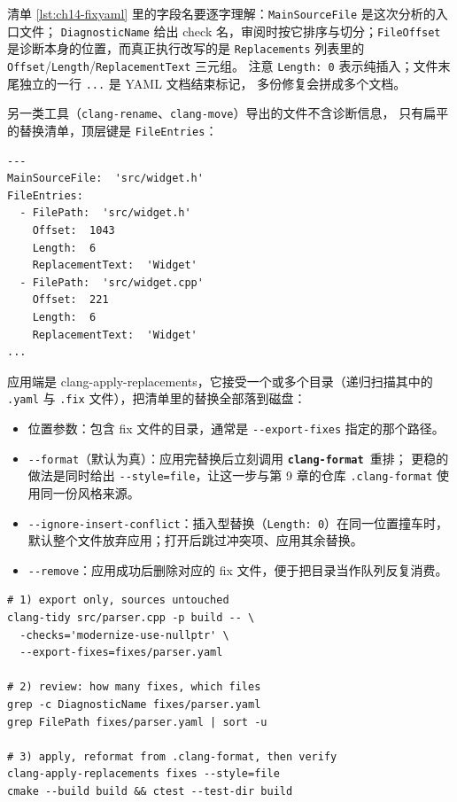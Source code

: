 \documentclass[12pt,a4paper,fontset=fandol]{ctexbook}
\newcommand{\Opt}[1]{\texttt{-\/-#1}}
\newcommand{\Bk}{\discretionary{}{}{}}
\newcommand{\Lib}[1]{\textbf{\texttt{#1}}}
\newcommand{\Fmt}{\Lib{clang-format}}
\begin{document}
清单 \ref{lst:ch14-fixyaml} 里的字段名要逐字理解：\texttt{Main{\Bk}Source{\Bk}File} 是这次分析的入口文件；
\texttt{Diagnostic{\Bk}Name} 给出 check 名，审阅时按它排序与切分；\texttt{FileOffset}
是诊断本身的位置，而真正执行改写的是 \texttt{Replacements} 列表里的
\texttt{Offset}/{\Bk}\texttt{Length}/{\Bk}\texttt{Replacement{\Bk}Text} 三元组。
注意 \texttt{Length: 0} 表示纯插入；文件末尾独立的一行 \texttt{...} 是 YAML 文档结束标记，
多份修复会拼成多个文档。

另一类工具（\texttt{clang-rename}、\texttt{clang-move}）导出的文件不含诊断信息，
只有扁平的替换清单，顶层键是 \texttt{FileEntries}：

\begin{lstlisting}[style=yamlstyle,caption={重构工具导出的替换清单：只有 FileEntries},label={lst:ch14-fileentries}]
---
MainSourceFile:  'src/widget.h'
FileEntries:
  - FilePath:  'src/widget.h'
    Offset:  1043
    Length:  6
    ReplacementText:  'Widget'
  - FilePath:  'src/widget.cpp'
    Offset:  221
    Length:  6
    ReplacementText:  'Widget'
...
\end{lstlisting}

应用端是 \Bk clang-apply-replacements\Bk，它接受一个或多个目录（递归扫描其中的
\texttt{.yaml} 与 \texttt{.fix} 文件），把清单里的替换全部落到磁盘：

\begin{itemize}
  \item 位置参数：包含 fix 文件的目录，通常是 \Opt{export-fixes} 指定的那个路径。
  \item \Opt{format}（默认为真）：应用完替换后立刻调用 \Fmt\ 重排；
        更稳的做法是同时给出 \Opt{style=file}，让这一步与第 9 章的仓库
        \texttt{.clang-format} 使用同一份风格来源。
  \item \Opt{ignore-insert-conflict}：插入型替换（\texttt{Length: 0}）在同一位置撞车时，
        默认整个文件放弃应用；打开后跳过冲突项、应用其余替换。
  \item \Opt{remove}：应用成功后删除对应的 fix 文件，便于把目录当作队列反复消费。
\end{itemize}

\begin{lstlisting}[style=shellstyle,caption={导出、审阅、应用的最小闭环},label={lst:ch14-apply}]
# 1) export only, sources untouched
clang-tidy src/parser.cpp -p build -- \
  -checks='modernize-use-nullptr' \
  --export-fixes=fixes/parser.yaml

# 2) review: how many fixes, which files
grep -c DiagnosticName fixes/parser.yaml
grep FilePath fixes/parser.yaml | sort -u

# 3) apply, reformat from .clang-format, then verify
clang-apply-replacements fixes --style=file
cmake --build build && ctest --test-dir build
\end{lstlisting}
\end{document}
